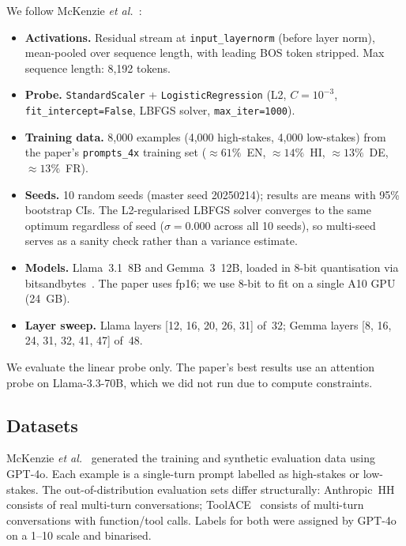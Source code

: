 \documentclass{article}
\newcommand{\etal}{\textit{et al.}\xspace}
\newcommand{\llama}{Llama~3.1~8B\xspace}
\newcommand{\gemma}{Gemma~3~12B\xspace}
\begin{document}
We follow McKenzie \etal~\cite{mckenzie2025}:
\begin{itemize}[nosep]
  \item \textbf{Activations.} Residual stream at \texttt{input\_layernorm}
        (before layer norm), mean-pooled over sequence length, with leading
        BOS token stripped. Max sequence length: 8,192 tokens.
  \item \textbf{Probe.} \texttt{StandardScaler} + \texttt{LogisticRegression}
        (L2, $C{=}10^{-3}$, \texttt{fit\_intercept=False}, LBFGS solver,
        \texttt{max\_iter=1000}).
  \item \textbf{Training data.} 8,000 examples (4,000 high-stakes,
        4,000 low-stakes) from the paper's \texttt{prompts\_4x} training set
        (${\approx}61\%$~EN, ${\approx}14\%$~HI, ${\approx}13\%$~DE,
        ${\approx}13\%$~FR).
  \item \textbf{Seeds.} 10 random seeds (master seed 20250214); results are
        means with 95\% bootstrap CIs.
        The L2-regularised LBFGS solver converges to the same optimum
        regardless of seed ($\sigma{=}0.000$ across all 10 seeds), so
        multi-seed serves as a sanity check rather than a variance estimate.
  \item \textbf{Models.} \llama and \gemma, loaded in 8-bit quantisation via
        bitsandbytes~\cite{dettmers2022}.
        The paper uses fp16; we use 8-bit to fit on a single A10 GPU (24~GB).
  \item \textbf{Layer sweep.} Llama layers [12, 16, 20, 26, 31] of~32;
        Gemma layers [8, 16, 24, 31, 32, 41, 47] of~48.
\end{itemize}

We evaluate the linear probe only.
The paper's best results use an attention probe on Llama-3.3-70B, which we did
not run due to compute constraints.

\subsection{Datasets}
\label{sec:datasets}

McKenzie \etal~\cite{mckenzie2025} generated the training and synthetic
evaluation data using GPT-4o.
Each example is a single-turn prompt labelled as high-stakes or low-stakes.
The out-of-distribution evaluation sets differ structurally:
Anthropic~HH~\cite{bai2022} consists of real multi-turn conversations;
ToolACE~\cite{liu2024toolace} consists of multi-turn conversations with
function/tool calls.
Labels for both were assigned by GPT-4o on a 1--10 scale and binarised.
\end{document}
